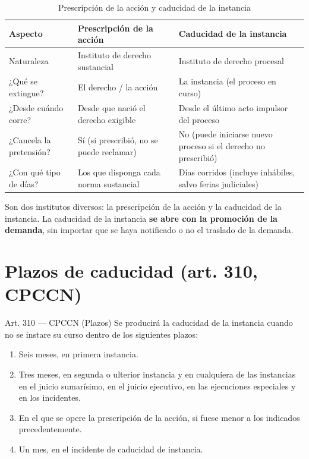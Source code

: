 \documentclass[12pt,oneside]{book}
\begin{document}
\begin{table}[H]
\centering
\caption{Prescripción de la acción y caducidad de la instancia}
\small
\begin{tabularx}{\textwidth}{
    >{\raggedright\arraybackslash}p{}
    >{\raggedright\arraybackslash}X
    >{\raggedright\arraybackslash}X
}
\toprule
\textbf{Aspecto} & \textbf{Prescripción de la acción} & \textbf{Caducidad de la instancia} \\
\midrule
Naturaleza & Instituto de derecho sustancial & Instituto de derecho procesal \\
¿Qué se extingue? & El derecho / la acción & La instancia (el proceso en curso) \\
¿Desde cuándo corre? & Desde que nació el derecho exigible & Desde el último acto impulsor del proceso \\
¿Cancela la pretensión? & Sí (si prescribió, no se puede reclamar) & No (puede iniciarse nuevo proceso si el derecho no prescribió) \\
¿Con qué tipo de días? & Los que disponga cada norma sustancial & Días corridos (incluye inhábiles, salvo ferias judiciales) \\
\bottomrule
\end{tabularx}
\end{table}

Son dos institutos diversos: la prescripción de la acción y la caducidad de la instancia. La caducidad de la instancia \textbf{se abre con la promoción de la demanda}, sin importar que se haya notificado o no el traslado de la demanda.

\section{Plazos de caducidad (art. 310, CPCCN)}

\begin{articulo}{Art. 310 --- CPCCN (Plazos)}
Se producirá la caducidad de la instancia cuando no se instare su curso dentro de los siguientes plazos:
\begin{enumerate}[label=\arabic*°]
    \item Seis meses, en primera instancia.
    \item Tres meses, en segunda o ulterior instancia y en cualquiera de las instancias en el juicio sumarísimo, en el juicio ejecutivo, en las ejecuciones especiales y en los incidentes.
    \item En el que se opere la prescripción de la acción, si fuese menor a los indicados precedentemente.
    \item Un mes, en el incidente de caducidad de instancia.
\end{enumerate}
\end{articulo}
\end{document}
